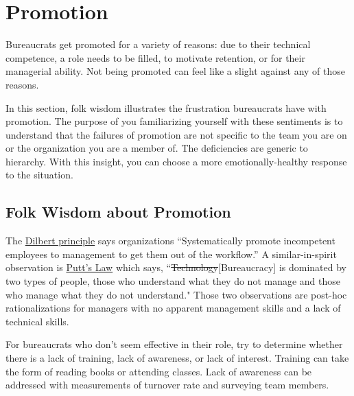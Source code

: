 \section{Promotion\label{sec:promotion}}

Bureaucrats get promoted for a variety of reasons: due to their technical competence, a role needs to be filled, to motivate retention, or for their managerial ability.  Not being promoted can feel like a slight against any of those reasons. 

In this section, folk wisdom illustrates the frustration bureaucrats have with promotion. The purpose of you familiarizing yourself with these sentiments is to understand that the failures of promotion are not specific to the team you are on or the organization you are a member of. The deficiencies are generic to hierarchy. With this insight, you can choose a more emotionally-healthy response to the situation. 

\subsection*{Folk Wisdom about Promotion}

The 
\href{https://en.wikipedia.org/wiki/Dilbert_principle}{Dilbert principle}
says organizations
``Systematically promote incompetent employees to management to get them out of the workflow.''
A similar-in-spirit observation is 
\href{https://en.wikipedia.org/wiki/Putt\%27s_Law_and_the_Successful_Technocrat}{Putt's Law}
which says,
``\sout{Technology}[Bureaucracy] is dominated by two types of people, those who understand what they do not manage and those who manage what they do not understand."
Those two observations are post-hoc rationalizations for managers with no apparent management skills and a lack of technical skills. 

For bureaucrats who don't seem effective in their role, try to determine whether there is a lack of training, lack of awareness, or lack of interest. Training can take the form of reading books or attending classes. Lack of awareness can be addressed with measurements of turnover rate and surveying team members. 




